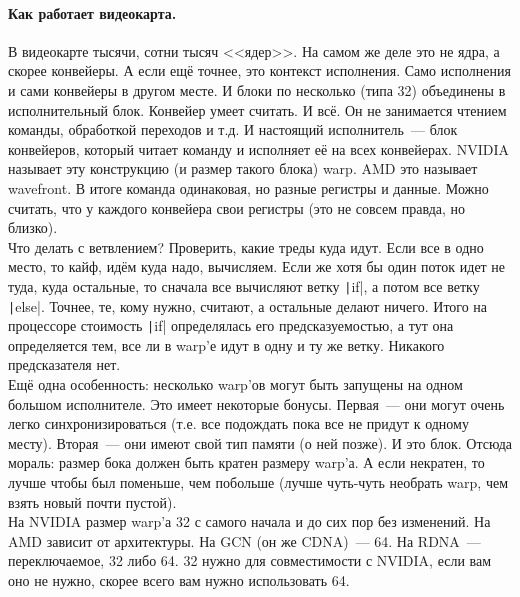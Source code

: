 \documentclass{article}
\begin{document}
    \paragraph{Как работает видеокарта.}
    В видеокарте тысячи, сотни тысяч <<ядер>>. На самом же деле это не ядра, а скорее конвейеры. А если ещё точнее, это контекст исполнения. Само исполнения и сами конвейеры в другом месте. И блоки по несколько (типа 32) объединены в исполнительный блок. Конвейер умеет считать. И всё. Он не занимается чтением команды, обработкой переходов и т.д. И настоящий исполнитель~--- блок конвейеров, который читает команду и исполняет её на всех конвейерах. NVIDIA называет эту конструкцию (и размер такого блока) warp. AMD это называет wavefront. В итоге команда одинаковая, но разные регистры и данные. Можно считать, что у каждого конвейера свои регистры (это не совсем правда, но близко).\\
    Что делать с ветвлением? Проверить, какие треды куда идут. Если все в одно место, то кайф, идём куда надо, вычисляем. Если же хотя бы один поток идет не туда, куда остальные, то сначала все вычисляют ветку \texttt|if|, а потом все ветку \texttt|else|. Точнее, те, кому нужно, считают, а остальные делают ничего. Итого на процессоре стоимость \texttt|if| определялась его предсказуемостью, а тут она определяется тем, все ли в warp'е идут в одну и ту же ветку. Никакого предсказателя нет.\\
    Ещё одна особенность: несколько warp'ов могут быть запущены на одном большом исполнителе. Это имеет некоторые бонусы. Первая~--- они могут очень легко синхронизироваться (т.е. все подождать пока все не придут к одному месту). Вторая~--- они имеют свой тип памяти (о ней позже). И это блок. Отсюда мораль: размер бока должен быть кратен размеру warp'а. А если некратен, то лучше чтобы был поменьше, чем побольше (лучше чуть-чуть необрать warp, чем взять новый почти пустой).\\
    На NVIDIA размер warp'а 32 с самого начала и до сих пор без изменений. На AMD зависит от архитектуры. На GCN (он же CDNA)~--- 64. На RDNA~--- переключаемое, 32 либо 64. 32 нужно для совместимости с NVIDIA, если вам оно не нужно, скорее всего вам нужно использовать 64.\\
\end{document}
